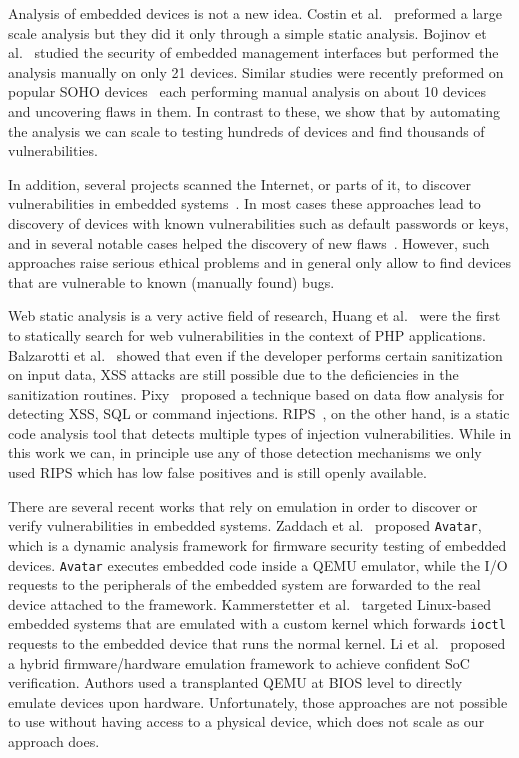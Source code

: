 \documentclass[conference]{./templates/ndss/IEEEtran}
\newcounter{t0d0_counter}
\newcounter{pr00f_counter}
\begin{document}
Analysis of embedded devices is not a new idea.
Costin et al.~\cite{costin2014large} preformed a large scale analysis but they 
did it only through a simple static analysis.
Bojinov et al.~\cite{elie-bh2009-EmbedInterfMassInsec} studied the security of
embedded management interfaces but performed the analysis manually on
only 21 devices. Similar studies were recently preformed on popular
SOHO devices~\cite{seceval-trendnet, hpfortifyiot2014} each performing
manual analysis on about 10 devices and uncovering flaws in them. In
contrast to these, we show that by automating the analysis we can scale
to testing hundreds of devices and find thousands of vulnerabilities.

In addition, several projects scanned the Internet, or parts of it, to discover
vulnerabilities in embedded systems~\cite{cui-raid2009-BraveNewWorld,
cui-acsac2010-QuantAnalysInsecEmbDev, upnp_scan, internetcensus2012,
shodan, psqs2012}. In most cases these approaches lead to discovery
of devices with known vulnerabilities such as default passwords or
keys, and in several notable cases helped the discovery of new flaws~\cite{psqs2012}. However,
such approaches raise serious ethical problems
and in general only allow to find devices that are vulnerable to known
(manually found) bugs.


Web static analysis is a very active field of research, Huang et
al.~\cite{Huang:2004:SWA:988672.988679} were the first to statically
search for web vulnerabilities in the context of PHP
applications. Balzarotti et al.~\cite{balzarotti2008saner} showed that even if the
developer performs certain sanitization on input data, XSS attacks are
still possible due to the deficiencies in the sanitization
routines.  Pixy~\cite{jovanovic2006pixy} proposed a technique based on data flow
analysis for detecting XSS, SQL or command injections.
RIPS~\cite{Dahse:rips:ndss14}, on the other hand, is a static code
analysis tool that detects multiple types of injection
vulnerabilities.  While in this work we can, in principle use any of those
detection mechanisms we only used RIPS which has low false positives
and is still openly available.





There are several recent works that rely on emulation in order to discover 
or verify vulnerabilities in embedded systems. 
    Zaddach et al.~\cite{zaddach:ndss14} proposed \texttt{Avatar}, which is a dynamic 
analysis framework for firmware security testing of embedded devices. 
\texttt{Avatar} executes embedded code inside a QEMU emulator, while the 
I/O requests to the peripherals of the embedded system are forwarded to
the real device attached to the framework. Kammerstetter et al.~\cite{prospect} targeted Linux-based embedded
systems that are emulated with a custom kernel which forwards
\texttt{ioctl} requests to the embedded device that runs the normal
kernel.  Li et al.~\cite{li2010femu} proposed a hybrid
firmware/hardware emulation framework to achieve confident SoC
verification. Authors used a transplanted QEMU at BIOS level to
directly emulate devices upon hardware.  Unfortunately, those
approaches are not possible to use without having access to a
physical device, which does not scale as our approach does. 
\end{document}
